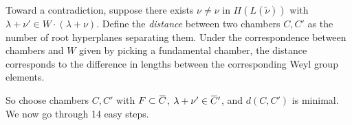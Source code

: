 \documentclass[11pt]{scrartcl}
\theoremstyle{definition}
\theoremstyle{theorem}
\theoremstyle{proof}
\newenvironment{proof}
{\pushQED{$\qed$}\pf}
{\par\popQED\endpf}
\theoremstyle{definition}
\theoremstyle{break}
\theoremstyle{problem}
\renewcommand{\bar}[1]{\mkern 1.5mu\overline{\mkern-1.5mu#1\mkern-1.5mu}\mkern 1.5mu}
\renewcommand{\qed}[0]{\hfill\blacksquare}
\begin{document}
\begin{proof}

\hfill

Toward a contradiction, suppose there exists \(\nu \neq \nu\) in
\(\Pi(L(\tilde \nu))\) with
\(\lambda + \nu' \in W\cdot (\lambda + \nu)\). Define the
\emph{distance} between two chambers \(C, C'\) as the number of root
hyperplanes separating them. Under the correspondence between chambers
and \(W\) given by picking a fundamental chamber, the distance
corresponds to the difference in lengths between the corresponding Weyl
group elements.

\hfill\break

So choose chambers \(C, C'\) with \(F \subset \bar C\),
\(\lambda + \nu' \in \bar C'\), and \(d(C, C')\) is minimal. We now go
through 14 easy steps.

\hfill\break


\end{proof}
\end{document}
